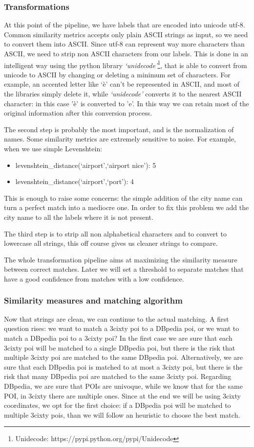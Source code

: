 \documentclass[paper=a4, fontsize=11pt]{scrartcl}
\begin{document}
\subsubsection{Transformations}
At this point of the pipeline, we have labels that are encoded into unicode utf-8. Common similarity metrics accepts only plain ASCII strings as input, so we need to convert them into ASCII. Since utf-8 can represent way more characters than ASCII, we need to strip non ASCII characters from our labels. This is done in an intelligent way using the python library \textit{`unidecode'}\footnote{Unidecode: https://pypi.python.org/pypi/Unidecode}, that is able to convert from unicode to ASCII by changing or deleting a minimum set of characters. For example, an accented letter like `è' can't be represented in ASCII, and most of the libraries simply delete it, while \textit{`unidecode'} converts it to the nearest ASCII character: in this case 'è' is converted to 'e'. In this way we can retain most of the original information after this conversion process.

The second step is probably the most important, and is the normalization of names. Some similarity metrics are extremely sensitive to noise. For example, when we use simple Levenshtein:
\begin{itemize}
\item levenshtein\_distance(`airport',`airport nice'): 5
\item levenshtein\_distance(`airport',`port'): 4
\end{itemize}
This is enough to raise some concerns: the simple addition of the city name can turn a perfect match into a mediocre one. In order to fix this problem we add the city name to all the labels where it is not present.

The third step is to strip all non alphabetical characters and to convert to lowercase all strings, this off course gives us cleaner strings to compare.

The whole transformation pipeline aims at maximizing the similarity measure between correct matches. Later we will set a threshold to separate matches that have a good confidence from matches with a low confidence.

\subsubsection{Similarity measures and matching algorithm}
Now that strings are clean, we can continue to the actual matching. A first question rises: we want to match a 3cixty poi to a DBpedia poi, or we want to match a DBpedia poi to a 3cixty poi? In the first case we are sure that each 3cixty poi will be matched to a single DBpedia poi, but there is the risk that multiple 3cixty poi are matched to the same DBpedia poi. Alternatively, we are sure that each DBpedia poi is matched to at most a 3cixty poi, but there is the risk that many DBpedia poi are matched to the same 3cixty poi.
Regarding DBpedia, we are sure that POIs are univoque, while we know that for the same POI, in 3cixty there are multiple ones.
Since at the end we will be using 3cixty coordinates, we opt for the first choice: if a DBpedia poi will be matched to multiple 3cixty pois, than we will follow an heuristic to choose the best match.
\end{document}
